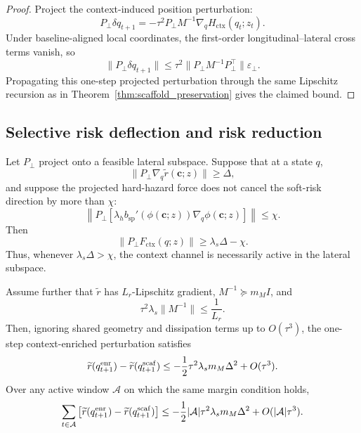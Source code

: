 \begin{proof}
Project the context-induced position perturbation:
\[
    P_\perp \delta q_{t+1}
    =
    -\tau^2P_\perp M^{-1}\nabla_qH_{\mathrm{ctx}}(q_t;z_t).
\]
Under baseline-aligned local coordinates, the first-order longitudinal--lateral cross
terms vanish, so
\[
    \|P_\perp \delta q_{t+1}\|
    \le
    \tau^2
    \|P_\perp M^{-1}P_\perp^\top\|
    \varepsilon_\perp .
\]
Propagating this one-step projected perturbation through the same Lipschitz recursion
as in Theorem~\ref{thm:scaffold_preservation} gives the claimed bound.
\end{proof}

\subsection{Selective risk deflection and risk reduction}

\begin{theorem}
\label{thm:risk_deflection}
Let \(P_\perp\) project onto a feasible lateral subspace. Suppose that at a state \(q\),
\[
    \|P_\perp\nabla_q\widetilde r(\mathbf c;z)\|\ge \Delta,
\]
and suppose the projected hard-hazard force does not cancel the soft-risk direction by
more than \(\chi\):
\[
    \left\|
    P_\perp
    \left[
    \lambda_h b_{\mathrm{sp}}'(\phi(\mathbf c;z))\nabla_q\phi(\mathbf c;z)
    \right]
    \right\|
    \le \chi.
\]
Then
\[
    \|P_\perp F_{\mathrm{ctx}}(q;z)\|
    \ge
    \lambda_s\Delta-\chi .
\]
Thus, whenever \(\lambda_s\Delta>\chi\), the context channel is necessarily active in
the lateral subspace.

Assume further that \(\widetilde r\) has \(L_r\)-Lipschitz gradient,
\(M^{-1}\succeq m_M I\), and
\[
    \tau^2\lambda_s\|M^{-1}\|\le \frac{1}{L_r}.
\]
Then, ignoring shared geometry and dissipation terms up to \(O(\tau^3)\), the
one-step context-enriched perturbation satisfies
\[
    \widetilde r(q_{t+1}^{\rm enr})
    -
    \widetilde r(q_{t+1}^{\rm scaf})
    \le
    -\frac12\tau^2\lambda_s m_M \Delta^2
    +
    O(\tau^3).
\]
Over any active window \(\mathcal A\) on which the same margin condition holds,
\[
    \sum_{t\in\mathcal A}
    \left[
    \widetilde r(q_{t+1}^{\rm enr})
    -
    \widetilde r(q_{t+1}^{\rm scaf})
    \right]
    \le
    -\frac12|\mathcal A|\tau^2\lambda_s m_M \Delta^2
    +
    O(|\mathcal A|\tau^3).
\]
\end{theorem}

